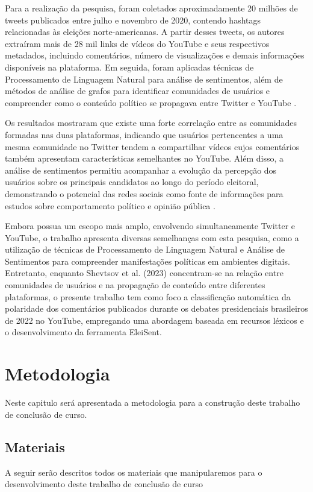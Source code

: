 \documentclass[
	12pt,				%
	openright,			%
	oneside,			%
	a4paper,			%
	english,			%
	brazil				%
	]{abntex2}
\begin{document}
Para a realização da pesquisa, foram coletados aproximadamente 20 milhões de tweets publicados entre julho e novembro de 2020, contendo hashtags relacionadas às eleições norte-americanas. A partir desses tweets, os autores extraíram mais de 28 mil links de vídeos do YouTube e seus respectivos metadados, incluindo comentários, número de visualizações e demais informações disponíveis na plataforma. Em seguida, foram aplicadas técnicas de Processamento de Linguagem Natural para análise de sentimentos, além de métodos de análise de grafos para identificar comunidades de usuários e compreender como o conteúdo político se propagava entre Twitter e YouTube \cite{Shevtsov2023}.

Os resultados mostraram que existe uma forte correlação entre as comunidades formadas nas duas plataformas, indicando que usuários pertencentes a uma mesma comunidade no Twitter tendem a compartilhar vídeos cujos comentários também apresentam características semelhantes no YouTube. Além disso, a análise de sentimentos permitiu acompanhar a evolução da percepção dos usuários sobre os principais candidatos ao longo do período eleitoral, demonstrando o potencial das redes sociais como fonte de informações para estudos sobre comportamento político e opinião pública \cite{Shevtsov2023}.

Embora possua um escopo mais amplo, envolvendo simultaneamente Twitter e YouTube, o trabalho apresenta diversas semelhanças com esta pesquisa, como a utilização de técnicas de Processamento de Linguagem Natural e Análise de Sentimentos para compreender manifestações políticas em ambientes digitais. Entretanto, enquanto Shevtsov et al. (2023) concentram-se na relação entre comunidades de usuários e na propagação de conteúdo entre diferentes plataformas, o presente trabalho tem como foco a classificação automática da polaridade dos comentários publicados durante os debates presidenciais brasileiros de 2022 no YouTube, empregando uma abordagem baseada em recursos léxicos e o desenvolvimento da ferramenta EleiSent.
\chapter{Metodologia}
Neste capitulo será apresentada a metodologia para a construção deste trabalho de conclusão de curso.
\section{Materiais}
A seguir serão descritos todos os materiais que manipularemos para o desenvolvimento deste trabalho de conclusão de curso
\end{document}
